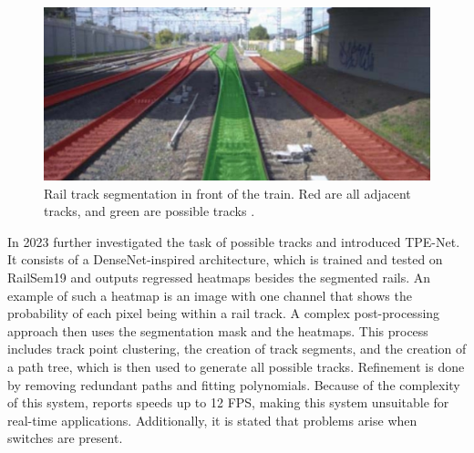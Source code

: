 \begin{figure}[H]
    \centering
    \includegraphics[width=0.7\linewidth]{PICs//semanticSegmentation/possibleTracks.jpg}
    \caption{Rail track segmentation in front of the train. Red are all adjacent tracks, and green are possible tracks \cite{RailraodSemanticPossibleTracks2020}.}
    \label{fig:possibleTracks}
\end{figure}

\noindent In 2023 \cite{TPENet2023} further investigated the task of possible tracks and introduced \ac{TPE-Net}.
It consists of a DenseNet-inspired \cite{DenseNets} architecture, which is trained and tested on RailSem19 and outputs regressed heatmaps besides the segmented rails.
An example of such a heatmap is an image with one channel that shows the probability of each pixel being within a rail track.
A complex post-processing approach then uses the segmentation mask and the heatmaps.
This process includes track point clustering, the creation of track segments, and the creation of a path tree, which is then used to generate all possible tracks.
Refinement is done by removing redundant paths and fitting polynomials.
Because of the complexity of this system, \cite{TPENet2023} reports speeds up to 12 \ac{FPS}, making this system unsuitable for real-time applications.
Additionally, it is stated that problems arise when switches are present.
